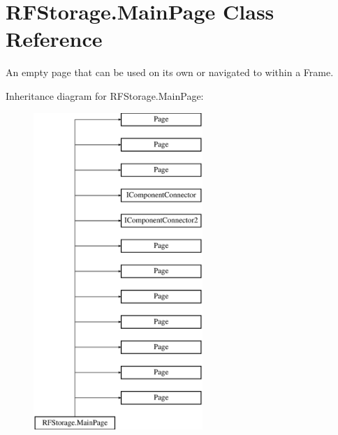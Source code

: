 \hypertarget{class_r_f_storage_1_1_main_page}{}\section{R\+F\+Storage.\+Main\+Page Class Reference}
\label{class_r_f_storage_1_1_main_page}


An empty page that can be used on its own or navigated to within a Frame.  


Inheritance diagram for R\+F\+Storage.\+Main\+Page\+:\begin{figure}[H]
\begin{center}
\leavevmode
\includegraphics[height=12.000000cm]{class_r_f_storage_1_1_main_page}
\end{center}
\end{figure}
